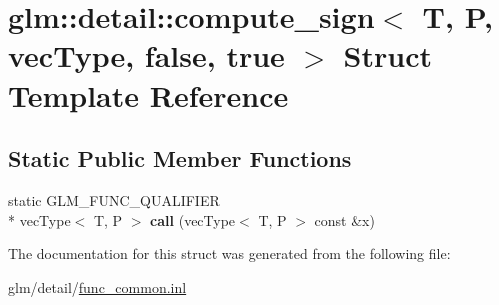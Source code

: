 \hypertarget{structglm_1_1detail_1_1compute__sign_3_01T_00_01P_00_01vecType_00_01false_00_01true_01_4}{\section{glm\-:\-:detail\-:\-:compute\-\_\-sign$<$ T, P, vec\-Type, false, true $>$ Struct Template Reference}
\label{structglm_1_1detail_1_1compute__sign_3_01T_00_01P_00_01vecType_00_01false_00_01true_01_4}
}
\subsection*{Static Public Member Functions}
\begin{DoxyCompactItemize}
\item 
\hypertarget{structglm_1_1detail_1_1compute__sign_3_01T_00_01P_00_01vecType_00_01false_00_01true_01_4_a9b729248aeae16a34e16941d18a50433}{static G\-L\-M\-\_\-\-F\-U\-N\-C\-\_\-\-Q\-U\-A\-L\-I\-F\-I\-E\-R \\*
vec\-Type$<$ T, P $>$ {\bfseries call} (vec\-Type$<$ T, P $>$ const \&x)}\label{structglm_1_1detail_1_1compute__sign_3_01T_00_01P_00_01vecType_00_01false_00_01true_01_4_a9b729248aeae16a34e16941d18a50433}

\end{DoxyCompactItemize}


The documentation for this struct was generated from the following file\-:\begin{DoxyCompactItemize}
\item 
glm/detail/\hyperlink{func__common_8inl}{func\-\_\-common.\-inl}\end{DoxyCompactItemize}
